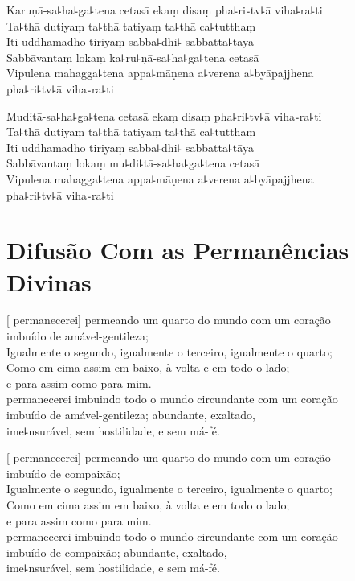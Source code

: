 Karuṇā-sa꜕ha꜕ga꜕tena cetasā ekaṃ disaṃ pha꜕ri꜕tv꜕ā viha꜕ra꜕ti\\
Ta꜕thā dutiyaṃ ta꜕thā tatiyaṃ ta꜕thā ca꜕tutthaṃ\\
Iti uddhamadho tiriyaṃ sabba꜕dhi꜕ sabbatta꜕tāya\\
Sabbāvantaṃ lokaṃ ka꜕ru꜕ṇā-sa꜕ha꜕ga꜕tena cetasā\\
Vipulena mahagga꜕tena appa꜕māṇena a꜕verena a꜕byāpajjhena\\
\vin pha꜕ri꜕tv꜕ā viha꜕ra꜕ti

Muditā-sa꜕ha꜕ga꜕tena cetasā ekaṃ disaṃ pha꜕ri꜕tv꜕ā viha꜕ra꜕ti\\
Ta꜕thā dutiyaṃ ta꜕thā tatiyaṃ ta꜕thā ca꜕tutthaṃ\\
Iti uddhamadho tiriyaṃ sabba꜕dhi꜕ sabbatta꜕tāya\\
Sabbāvantaṃ lokaṃ mu꜕di꜕tā-sa꜕ha꜕ga꜕tena cetasā\\
Vipulena mahagga꜕tena appa꜕māṇena a꜕verena a꜕byāpajjhena\\
\vin pha꜕ri꜕tv꜕ā viha꜕ra꜕ti

\chapter[Permanências Divinas]{Difusão Com as Permanências Divinas}

\enlargethispage{\baselineskip}


\begin{leader}
\end{leader}

[ permanecerei] permeando um quarto do mundo com um coração\\
\vin imbuído de amável-gentileza;\\
Igualmente o segundo, igualmente o terceiro, igualmente o quarto;\\
Como em cima assim em baixo, à volta e em todo o lado;\\
\vin e para  assim como para mim.\\
 permanecerei imbuindo todo o mundo circundante com um coração \\
\vin imbuído de amável-gentileza; abundante, exaltado,\\
\vin ime꜕nsurável, sem hostilidade, e sem má-fé.

[ permanecerei] permeando um quarto do mundo com um coração\\
\vin imbuído de compaixão;\\
Igualmente o segundo, igualmente o terceiro, igualmente o quarto;\\
Como em cima assim em baixo, à volta e em todo o lado;\\
\vin e para  assim como para mim.\\
 permanecerei imbuindo todo o mundo circundante com um coração\\
\vin imbuído de compaixão; abundante, exaltado,\\
\vin ime꜕nsurável, sem hostilidade, e sem má-fé.

